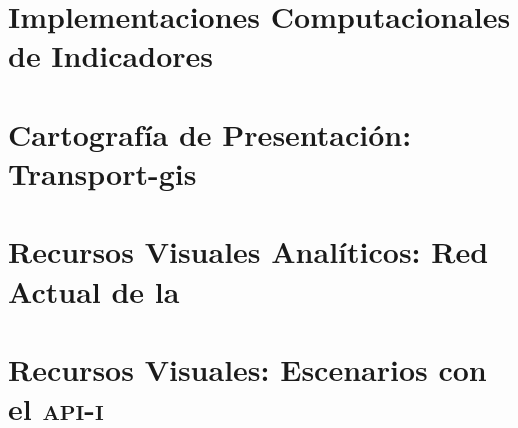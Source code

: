 \documentclass[12pt,letterpaper,oneside]{book}
\begin{document}
\chapter{Implementaciones Computacionales de Indicadores}
\label{anx:indicadores-implementacion}


\chapter{Cartografía de Presentación: Transport-gis}
\label{anx:cartografia-presentacion}


\chapter{Recursos Visuales Analíticos: Red Actual de la \protect\zmvm}
\label{anx:visualizaciones-analiticas}


\chapter{Recursos Visuales: Escenarios con el \protect\textsc{api-i}}
\label{anx:visualizaciones-anillo}


\fi

\backmatter


\end{document}
